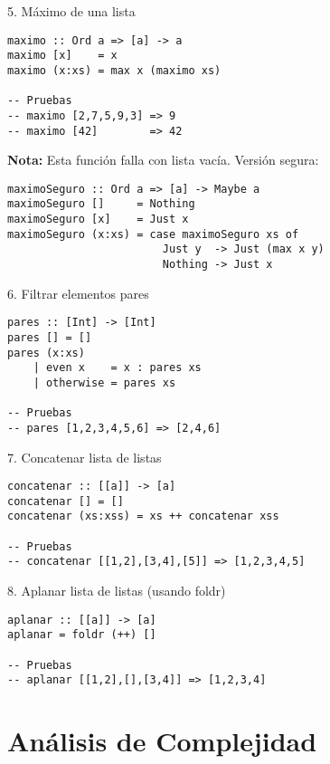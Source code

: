 \documentclass[12pt]{article}
\begin{document}
\begin{ejercicio}{5. Máximo de una lista}
\begin{lstlisting}
maximo :: Ord a => [a] -> a
maximo [x]    = x
maximo (x:xs) = max x (maximo xs)

-- Pruebas
-- maximo [2,7,5,9,3] => 9
-- maximo [42]        => 42
\end{lstlisting}
\textbf{Nota:} Esta función falla con lista vacía. Versión segura:
\begin{lstlisting}
maximoSeguro :: Ord a => [a] -> Maybe a
maximoSeguro []     = Nothing
maximoSeguro [x]    = Just x
maximoSeguro (x:xs) = case maximoSeguro xs of
                        Just y  -> Just (max x y)
                        Nothing -> Just x
\end{lstlisting}
\end{ejercicio}

\begin{ejercicio}{6. Filtrar elementos pares}
\begin{lstlisting}
pares :: [Int] -> [Int]
pares [] = []
pares (x:xs)
    | even x    = x : pares xs
    | otherwise = pares xs

-- Pruebas
-- pares [1,2,3,4,5,6] => [2,4,6]
\end{lstlisting}
\end{ejercicio}

\begin{ejercicio}{7. Concatenar lista de listas}
\begin{lstlisting}
concatenar :: [[a]] -> [a]
concatenar [] = []
concatenar (xs:xss) = xs ++ concatenar xss

-- Pruebas
-- concatenar [[1,2],[3,4],[5]] => [1,2,3,4,5]
\end{lstlisting}
\end{ejercicio}

\begin{ejercicio}{8. Aplanar lista de listas (usando foldr)}
\begin{lstlisting}
aplanar :: [[a]] -> [a]
aplanar = foldr (++) []

-- Pruebas
-- aplanar [[1,2],[],[3,4]] => [1,2,3,4]
\end{lstlisting}
\end{ejercicio}

\section*{Análisis de Complejidad}
\end{document}
